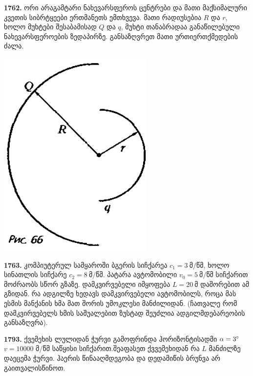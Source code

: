 \documentclass[12pt,a4paper,]{report}
\begin{document}
\textbf{1762.} ორი არაგამტარი ნახევარსფეროს ცენტრები და მათი მაქსიმალური კვეთის სიბრტყეები ერთმანეთს ემთხვევა. მათი რადიუსებია $R$ და $r$, ხოლო მუხტები შესაბამისად $Q$ და $q$, მუხტი თანაბრადაა განაწილებული ნახევარსფეროების ზედაპირზე. განსაზღვრეთ მათი ურთიერთქმედების ძალა.
		\begin{center}
			\includegraphics[scale=0.5]{images/F1762.png}
		\end{center}
	
\textbf{1763.} კომპიუტერულ სამყაროში ბგერის სიჩქარეა $c_1=3 \ \text{მ/წმ}$, ხოლო სინათლის სიჩქარე $c_2=8 \ \text{მ/წმ}$. პატარა ავტომობილი $v_0=5 \ \text{მ/წმ}$ სიჩქარით მოძრაობს სწორ გზაზე. დამკვირვებელი იმყოფება $L=20 \ \text{მ}$ დაშორებით ამ გზიდან. რა ადგილზე ხედავს დამკვირვებელი ავტომობილს, როცა მას ესმის მანქანის ხმა მათ შორის უმოკლესი მანძილიდან. (ჩათვალე რომ დამკვირვებელს ხმის საშუალებით ზუსტად შეუძლია ადგილმდებარეობის განსაზღვრა).

\textbf{1793.} ქვემეხის ლულიდან ჭურვი გამოფრინდა ჰორიზონტისადმი $\alpha = 3 \degree$ $v = 10000$ მ/წმ საწყისი სიჩქარით.შეაფასეთ ქვვემეხიდან რა $L$ მანძილზე დაეცემა ჭურვი. ჰაერის წინააღმდეგობა და დედამიწის ბრუნვა არ გაითვალისწინოთ.
\end{document}
